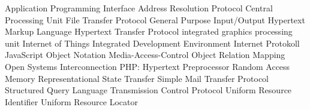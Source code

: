 \begin{acronym}[Bash]
  {Application Programming Interface}
  {Address Resolution Protocol}
  {Central Processing Unit}
  {File Transfer Protocol}
  {General Purpose Input/Output}
  {Hypertext Markup Language}
  {Hypertext Transfer Protocol}
  {integrated graphics processing unit}
  {Internet of Things}
  {Integrated Development Environment}
  {Internet Protokoll}
  {JavaScript Object Notation}
  {Media-Access-Control}
  {Object Relation Mapping}
  {Open Systems Interconnection}
  {PHP: Hypertext Preprocessor}
  {Random Access Memory}
  {Representational State Transfer}
  {Simple Mail Transfer Protocol}
  {Structured Query Language}
  {Transmission Control Protocol}
  {Uniform Resource Identifier}
  {Uniform Resource Locator}
\end{acronym}

